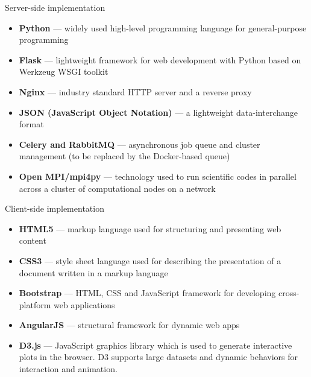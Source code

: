 \documentclass[final]{beamer}
\newlength{\onecolwid}
\begin{document}
\begin{frame}[t]
\begin{columns}[t]
\begin{column}{\onecolwid}
\begin{block}{\faServer{} Server-side implementation}
\begin{itemize}
  \item \textbf{Python} --- widely used high-level programming language for
  general-purpose programming
  \item \textbf{Flask} --- lightweight framework for web development with Python
  based on Werkzeug WSGI toolkit
  \item \textbf{Nginx} --- industry standard HTTP server and a reverse proxy
  \item \textbf{JSON (JavaScript Object Notation)} --- a lightweight
  data-interchange format
  \item \textbf{Celery and RabbitMQ} --- asynchronous job queue and cluster
  management (to be replaced by the Docker-based queue)
  \item \textbf{Open MPI/mpi4py} --- technology used to run scientific codes in
  parallel across a cluster of computational nodes on a network
\end{itemize}

\end{block}

\vspace{-0.5cm}
\begin{block}{\faFirefox{} \faChrome{} \faInternetExplorer{}  Client-side implementation}
\vspace{-0.5cm}

\begin{itemize}
  \item {} \textbf{HTML5} --- markup language used for structuring and
  presenting web content
  \item {} \textbf{CSS3} --- style sheet language used for describing the
  presentation of a document written in a markup language
  \item \textbf{Bootstrap} --- HTML, CSS and JavaScript framework for developing
  cross-platform web applications
  \item \textbf{AngularJS} --- structural framework for dynamic web apps
  \item \textbf{D3.js} --- JavaScript graphics library which is used to generate
  interactive plots in the browser. D3 supports large datasets and dynamic
  behaviors for interaction and animation.
\end{itemize}

\end{block}


\end{column}
\end{columns}
\end{frame}
\end{document}
